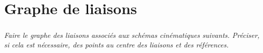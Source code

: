 \documentclass[10pt]{article}
\begin{document}






%
%

\section*{Graphe de liaisons}
\subparagraph*{}\textit{Faire le graphe des liaisons associés aux schémas cinématiques suivants. Préciser, si cela est nécessaire, des points au centre des liaisons et des références.}
\end{document}
